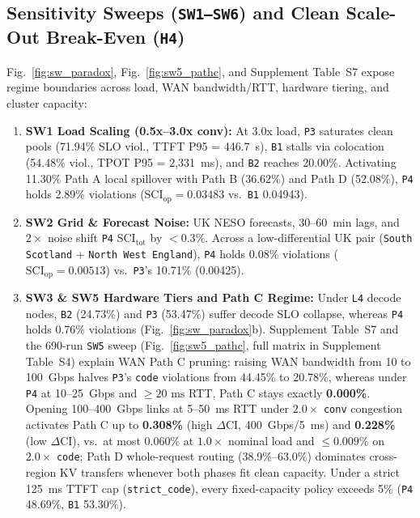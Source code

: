 \subsection{Sensitivity Sweeps (\texorpdfstring{\texttt{SW1--SW6}}{SW1-SW6}) and Clean Scale-Out Break-Even (\texorpdfstring{\texttt{H4}}{H4})}\label{subsec:res_sweeps}
Fig.~\ref{fig:sw_paradox}, Fig.~\ref{fig:sw5_pathc}, and Supplement Table~S7 expose regime boundaries across load, WAN bandwidth/RTT, hardware tiering, and cluster capacity:
\begin{enumerate}
    \item \textbf{SW1 Load Scaling (0.5x--3.0x conv):} At 3.0x load, \texttt{P3} saturates clean pools (71.94\% SLO viol., TTFT P95 = 446.7~s), \texttt{B1} stalls via colocation (54.48\% viol., TPOT P95 = 2,331~ms), and \texttt{B2} reaches 20.00\%. Activating 11.30\% Path A local spillover with Path B (36.62\%) and Path D (52.08\%), \texttt{P4} holds 2.89\% violations ($\text{SCI}_{\text{op}}=0.03483$ vs.\ \texttt{B1} 0.04943).
    \item \textbf{SW2 Grid \& Forecast Noise:} UK NESO forecasts, 30--60~min lags, and $2\times$ noise shift \texttt{P4} $\text{SCI}_{\text{tot}}$ by $<0.3\%$. Across a low-differential UK pair (\texttt{South Scotland} + \texttt{North West England}), \texttt{P4} holds 0.08\% violations ($\text{SCI}_{\text{op}}=0.00513$) vs.\ \texttt{P3}'s 10.71\% (0.00425).
    \item \textbf{SW3 \& SW5 Hardware Tiers and Path C Regime:} Under \texttt{L4} decode nodes, \texttt{B2} (24.73\%) and \texttt{P3} (53.47\%) suffer decode SLO collapse, whereas \texttt{P4} holds 0.76\% violations (Fig.~\ref{fig:sw_paradox}b). Supplement Table~S7 and the 690-run \texttt{SW5} sweep (Fig.~\ref{fig:sw5_pathc}, full matrix in Supplement Table~S4) explain WAN Path C pruning: raising WAN bandwidth from 10 to 100~Gbps halves \texttt{P3}'s \texttt{code} violations from 44.45\% to 20.78\%, whereas under \texttt{P4} at 10--25~Gbps and $\ge 20\text{ ms}$ RTT, Path C stays exactly \textbf{0.000\%}. Opening 100--400~Gbps links at 5--50~ms RTT under $2.0\times$ \texttt{conv} congestion activates Path C up to \textbf{0.308\%} (high $\Delta$CI, 400~Gbps/5~ms) and \textbf{0.228\%} (low $\Delta$CI), vs.\ at most 0.060\% at $1.0\times$ nominal load and $\le 0.009\%$ on $2.0\times$ \texttt{code}; Path D whole-request routing (38.9\%--63.0\%) dominates cross-region KV transfers whenever both phases fit clean capacity. Under a strict 125~ms TTFT cap (\texttt{strict\_code}), every fixed-capacity policy exceeds 5\% (\texttt{P4} 48.69\%, \texttt{B1} 53.30\%).

\end{enumerate}
